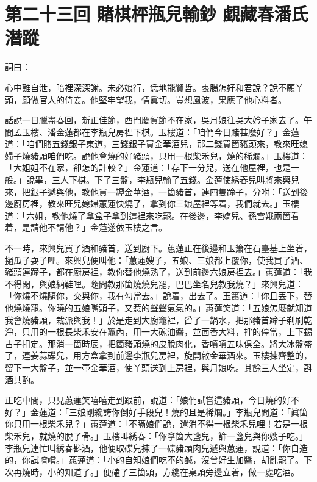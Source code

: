 
\chapter*{第二十三回 賭棋枰瓶兒輸鈔 覷藏春潘氏潛蹤}


詞曰：

\begin{myquote} 
心中難自泄，暗裡深深謝。未必娘行，恁地能賢哲。衷腸怎好和君說？說不願丫頭，願做官人的侍妾。他堅牢望我，情眞切。豈想風波，果應了他心料者。

\end{myquote} 

話說一日臘盡春回，新正佳節，西門慶賀節不在家，吳月娘往吳大妗子家去了。午間孟玉樓、潘金蓮都在李瓶兒房裡下棋。玉樓道：「咱們今日賭甚麼好？」金蓮道：「咱們賭五錢銀子東道，三錢銀子買金華酒兒，那二錢買箇豬頭來，教來旺媳婦子燒豬頭咱們吃。說他會燒的好豬頭，只用一根柴禾兒，燒的稀爛。」玉樓道：「大姐姐不在家，卻怎的計較？」金蓮道：「存下一分兒，送在他屋裡，也是一般。」說畢，三人下棋。下了三盤，李瓶兒輸了五錢。{}金蓮使綉春兒叫將來興兒來，把銀子遞與他，教他買一罈金華酒，一箇豬首，連四隻蹄子，分咐：「送到後邊廚房裡，教來旺兒媳婦蕙蓮快燒了，拿到你三娘屋裡等着，我們就去。」玉樓道：「六姐，教他燒了拿盒子拿到這裡來吃罷。在後邊，李嬌兒、孫雪娥兩箇看着，是請他不請他？」{}金蓮遂依玉樓之言。

不一時，來興兒買了酒和豬首，送到廚下。蕙蓮正在後邊和玉簫在石臺基上坐着，撾瓜子耍子哩。來興兒便叫他：「蕙蓮嫂子，五娘、三娘都上覆你，使我買了酒、豬頭連蹄子，都在廚房裡，教你替他燒熟了，送到前邊六娘房裡去。」蕙蓮道：「我不得閑，與娘納鞋哩。隨問教那箇燒燒兒罷，巴巴坐名兒教我燒？」來興兒道：「你燒不燒隨你，交與你，我有勾當去。」說着，出去了。玉簫道：「你且丟下，替他燒燒罷。你曉的五娘嘴頭子，又惹的聲聲氣氣的。」蕙蓮笑道：「五娘怎麼就知道我會燒豬頭，栽派與我！」於是走到大廚竈裡，舀了一鍋水，把那豬首蹄子剃刷乾淨，只用的一根長柴禾安在竈內，用一大碗油醬，並茴香大料，拌的停當，上下錫古子扣定。那消一箇時辰，把箇豬頭燒的皮脫肉化，香噴噴五味俱全。將大冰盤盛了，連姜蒜碟兒，用方盒拿到前邊李瓶兒房裡，旋開啟金華酒來。玉樓揀齊整的，留下一大盤子，並一壺金華酒，使丫頭送到上房裡，與月娘吃。其餘三人坐定，斟酒共酌。

正吃中間，只見蕙蓮笑嘻嘻走到跟前，說道：「娘們試嘗這豬頭，今日燒的好不好？」金蓮道：「三娘剛纔誇你倒好手段兒！燒的且是稀爛。」李瓶兒問道：「眞箇你只用一根柴禾兒？」蕙蓮道：「不瞞娘們說，還消不得一根柴禾兒哩！若是一根柴禾兒，就燒的脫了骨。」玉樓叫綉春：「你拿箇大盞兒，篩一盞兒與你嫂子吃。」李瓶兒連忙叫綉春斟酒，他便取碟兒揀了一碟豬頭肉兒遞與蕙蓮，說道：「你自造的，你試嚐嚐。」蕙蓮道：「小的自知娘們吃不的鹹，沒曾好生加醬，胡亂罷了。下次再燒時，小的知道了。」{}便磕了三箇頭，方纔在桌頭旁邊立着，做一處吃酒。

